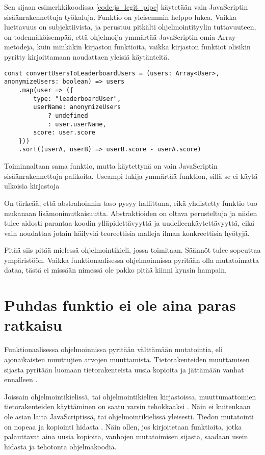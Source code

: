Sen sijaan esimerkkikoodissa \ref{code:js_legit_pipe} käytetään vain JavaScriptin sisäänrakennettuja työkaluja. Funktio on yleisemmin helppo lukea. Vaikka luettavuus on subjektiivista, ja perustuu pitkälti ohjelmointityylin tuttavuuteen, on todennäköisempää, että ohjelmoija ymmärtää JavaScriptin omia Array-metodeja, kuin minkäkin kirjaston funktioita, vaikka kirjaston funktiot olisikin pyritty kirjoittamaan noudattaen yleisiä käytänteitä.

\begin{code}
    \begin{verbatim}
const convertUsersToLeaderboardUsers = (users: Array<User>, anonymizeUsers: boolean) => users
    .map(user => ({
        type: "leaderboardUser",
        userName: anonymizeUsers 
            ? undefined 
            : user.userName,
        score: user.score
    }))
    .sort((userA, userB) => userB.score - userA.score)
    \end{verbatim}
    \caption{Toiminnaltaan sama funktio, mutta käytettynä on vain JavaScriptin sisäänrakennettuja palikoita. Useampi lukija ymmärtää funktion, sillä se ei käytä ulkoisia kirjastoja}
    \label{code:js_legit_pipe}
\end{code}


On tärkeää, että abstrahoinnin taso pysyy hallittuna, eikä yhdistetty funktio tuo mukanaan lisämonimutkaisuutta. Abstraktioiden on oltava perusteltuja ja niiden tulee aidosti parantaa koodin ylläpidettävyyttä ja uudelleenkäytettävyyttä, eikä vain noudattaa jotain häilyviä teoreettisia malleja ilman konkreettisia hyötyjä.


Pitää siis pitää mielessä ohjelmointikieli, jossa toimitaan. Säännöt tulee sopeuttaa ympäristöön. Vaikka funktionaalisessa ohjelmoinnissa pyritään olla mutatoimatta dataa, tästä ei missään nimessä ole pakko pitää kiinni kynsin hampain.

\section{Puhdas funktio ei ole aina paras ratkaisu}

Funktionaalisessa ohjelmoinnissa pyritään välttämään mutatointia, eli ajonaikaisten muuttujien arvojen muuttamista. Tietorakenteiden muuttamisen sijasta pyritään luomaan tietorakenteista uusia kopioita ja jättämään vanhat ennalleen \cite{immutablejs_immutable,hickey_persistent_2009}.

Joissain ohjelmointikielissä, tai ohjelmointikielien kirjastoissa, muuttumattomien tietorakenteiden käyttäminen on saatu varsin tehokkaaksi \cite{hickey_persistent_2009,immutablejs_immutable}. Näin ei kuitenkaan ole asian laita JavaScriptissä, tai ohjelmointikielissä yleisesti. Tiedon mutatointi on nopeaa ja kopiointi hidasta \cite{turner_trauring_copying_2020}. Näin ollen, jos kirjoitetaan funktioita, jotka palauttavat aina uusia kopioita, vanhojen mutatoimisen sijasta, saadaan usein hidasta ja tehotonta ohjelmakoodia.

